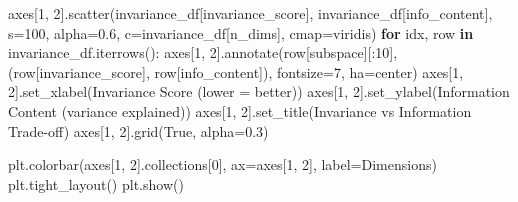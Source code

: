 \documentclass[
  letterpaper,
  DIV=11,
  numbers=noendperiod]{scrartcl}
\newenvironment{Shaded}{\begin{snugshade}}{\end{snugshade}}
\newcommand{\ControlFlowTok}[1]{\textcolor[rgb]{0.00,0.23,0.31}{\textbf{#1}}}
\newcommand{\DecValTok}[1]{\textcolor[rgb]{0.68,0.00,0.00}{#1}}
\newcommand{\FloatTok}[1]{\textcolor[rgb]{0.68,0.00,0.00}{#1}}
\newcommand{\KeywordTok}[1]{\textcolor[rgb]{0.00,0.23,0.31}{\textbf{#1}}}
\newcommand{\NormalTok}[1]{\textcolor[rgb]{0.00,0.23,0.31}{#1}}
\newcommand{\OperatorTok}[1]{\textcolor[rgb]{0.37,0.37,0.37}{#1}}
\newcommand{\StringTok}[1]{\textcolor[rgb]{0.13,0.47,0.30}{#1}}
\newcommand{\VariableTok}[1]{\textcolor[rgb]{0.07,0.07,0.07}{#1}}
\renewenvironment{Shaded}{%
  \begin{tcolorbox}[%
    enhanced,%
    colback=codebg,%
    colframe=codebg,%
    borderline west={3pt}{0pt}{sectionblue},%
    fontupper=\small\ttfamily,%
    boxrule=0pt,%
    arc=0pt,%
    boxsep=5pt,%
    left=2mm,%
    right=2mm,%
    top=2mm,%
    bottom=2mm%
  ]%
}{%
  \end{tcolorbox}%
}
\begin{document}
\begin{Shaded}
\begin{Highlighting}[]
\NormalTok{axes[}\DecValTok{1}\NormalTok{, }\DecValTok{2}\NormalTok{].scatter(invariance\_df[}\StringTok{\textquotesingle{}invariance\_score\textquotesingle{}}\NormalTok{], invariance\_df[}\StringTok{\textquotesingle{}info\_content\textquotesingle{}}\NormalTok{],}
\NormalTok{                  s}\OperatorTok{=}\DecValTok{100}\NormalTok{, alpha}\OperatorTok{=}\FloatTok{0.6}\NormalTok{, c}\OperatorTok{=}\NormalTok{invariance\_df[}\StringTok{\textquotesingle{}n\_dims\textquotesingle{}}\NormalTok{], cmap}\OperatorTok{=}\StringTok{\textquotesingle{}viridis\textquotesingle{}}\NormalTok{)}
\ControlFlowTok{for}\NormalTok{ idx, row }\KeywordTok{in}\NormalTok{ invariance\_df.iterrows():}
\NormalTok{    axes[}\DecValTok{1}\NormalTok{, }\DecValTok{2}\NormalTok{].annotate(row[}\StringTok{\textquotesingle{}subspace\textquotesingle{}}\NormalTok{][:}\DecValTok{10}\NormalTok{], }
\NormalTok{                       (row[}\StringTok{\textquotesingle{}invariance\_score\textquotesingle{}}\NormalTok{], row[}\StringTok{\textquotesingle{}info\_content\textquotesingle{}}\NormalTok{]),}
\NormalTok{                       fontsize}\OperatorTok{=}\DecValTok{7}\NormalTok{, ha}\OperatorTok{=}\StringTok{\textquotesingle{}center\textquotesingle{}}\NormalTok{)}
\NormalTok{axes[}\DecValTok{1}\NormalTok{, }\DecValTok{2}\NormalTok{].set\_xlabel(}\StringTok{\textquotesingle{}Invariance Score (lower = better)\textquotesingle{}}\NormalTok{)}
\NormalTok{axes[}\DecValTok{1}\NormalTok{, }\DecValTok{2}\NormalTok{].set\_ylabel(}\StringTok{\textquotesingle{}Information Content (variance explained)\textquotesingle{}}\NormalTok{)}
\NormalTok{axes[}\DecValTok{1}\NormalTok{, }\DecValTok{2}\NormalTok{].set\_title(}\StringTok{\textquotesingle{}Invariance vs Information Trade{-}off\textquotesingle{}}\NormalTok{)}
\NormalTok{axes[}\DecValTok{1}\NormalTok{, }\DecValTok{2}\NormalTok{].grid(}\VariableTok{True}\NormalTok{, alpha}\OperatorTok{=}\FloatTok{0.3}\NormalTok{)}

\NormalTok{plt.colorbar(axes[}\DecValTok{1}\NormalTok{, }\DecValTok{2}\NormalTok{].collections[}\DecValTok{0}\NormalTok{], ax}\OperatorTok{=}\NormalTok{axes[}\DecValTok{1}\NormalTok{, }\DecValTok{2}\NormalTok{], label}\OperatorTok{=}\StringTok{\textquotesingle{}Dimensions\textquotesingle{}}\NormalTok{)}
\NormalTok{plt.tight\_layout()}
\NormalTok{plt.show()}


\end{Highlighting}
\end{Shaded}
\end{document}
